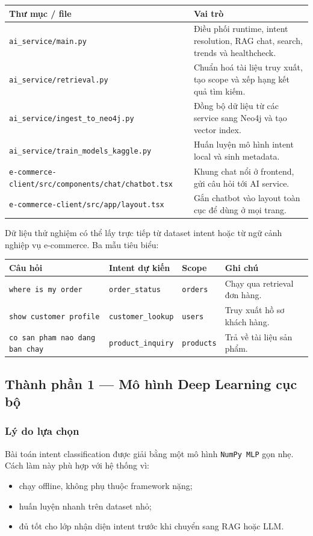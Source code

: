 \documentclass[12pt,a4paper]{article}
\begin{document}
\begin{longtable}{p{4.2cm}p{8.3cm}}
\toprule
\textbf{Thư mục / file} & \textbf{Vai trò} \\
\midrule
\texttt{ai\_service/main.py} & Điều phối runtime, intent resolution, RAG chat, search, trends và healthcheck. \\
\texttt{ai\_service/retrieval.py} & Chuẩn hoá tài liệu truy xuất, tạo scope và xếp hạng kết quả tìm kiếm. \\
\texttt{ai\_service/ingest\_to\_neo4j.py} & Đồng bộ dữ liệu từ các service sang Neo4j và tạo vector index. \\
\texttt{ai\_service/train\_models\_kaggle.py} & Huấn luyện mô hình intent local và sinh metadata. \\
\texttt{e-commerce-client/src/components/chat/chatbot.tsx} & Khung chat nổi ở frontend, gửi câu hỏi tới AI service. \\
\texttt{e-commerce-client/src/app/layout.tsx} & Gắn chatbot vào layout toàn cục để dùng ở mọi trang. \\
\bottomrule
\end{longtable}

Dữ liệu thử nghiệm có thể lấy trực tiếp từ dataset intent hoặc từ ngữ cảnh nghiệp vụ e-commerce. Ba mẫu tiêu biểu:

\begin{longtable}{p{4.2cm}p{3.1cm}p{3.1cm}p{2.2cm}}
\toprule
\textbf{Câu hỏi} & \textbf{Intent dự kiến} & \textbf{Scope} & \textbf{Ghi chú} \\
\midrule
\texttt{where is my order} & \texttt{order\_status} & \texttt{orders} & Chạy qua retrieval đơn hàng. \\
\texttt{show customer profile} & \texttt{customer\_lookup} & \texttt{users} & Truy xuất hồ sơ khách hàng. \\
\texttt{co san pham nao dang ban chay} & \texttt{product\_inquiry} & \texttt{products} & Trả về tài liệu sản phẩm. \\
\bottomrule
\end{longtable}

\subsection{Thành phần 1 --- Mô hình Deep Learning cục bộ}
\subsubsection{Lý do lựa chọn}
Bài toán intent classification được giải bằng một mô hình \texttt{NumPy MLP} gọn nhẹ. Cách làm này phù hợp với hệ thống vì:
\begin{itemize}
  \item chạy offline, không phụ thuộc framework nặng;
  \item huấn luyện nhanh trên dataset nhỏ;
  \item đủ tốt cho lớp nhận diện intent trước khi chuyển sang RAG hoặc LLM.
\end{itemize}
\end{document}
